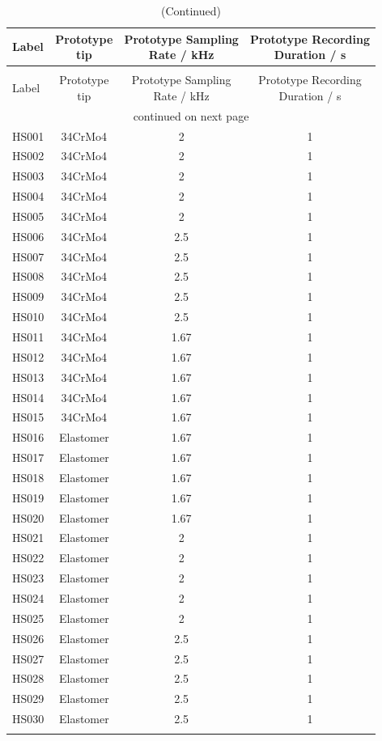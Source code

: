 {\scriptsize%
\begin{longtable}{lccc}
\caption[Hammer-Surface Measurements]{Hammer-surface measurements}\\
\toprule
Label & \makecell{Prototype\\tip} & \makecell{Prototype Sampling\\Rate / \si{\kilo\hertz}} & \makecell{Prototype Recording\\Duration / \si{\second}}\\
\midrule
\endfirsthead%
\caption[]{(Continued)}\\
\toprule
Label & \makecell{Prototype\\tip} & \makecell{Prototype Sampling\\Rate / \si{\kilo\hertz}} & \makecell{Prototype Recording\\Duration / \si{\second}}\\
\midrule
\endhead%
\midrule
\multicolumn{4}{c}{continued on next page}\\
\bottomrule
\endfoot%
\endlastfoot%
	HS001 & 34CrMo4 & 2 & 1\\
	HS002 & 34CrMo4 & 2 & 1\\
	HS003 & 34CrMo4 & 2 & 1\\
	HS004 & 34CrMo4 & 2 & 1\\
	HS005 & 34CrMo4 & 2 & 1\\
	HS006 & 34CrMo4 & 2.5 & 1\\
	HS007 & 34CrMo4 & 2.5 & 1\\
	HS008 & 34CrMo4 & 2.5 & 1\\
	HS009 & 34CrMo4 & 2.5 & 1\\
	HS010 & 34CrMo4 & 2.5 & 1\\
	HS011 & 34CrMo4 & 1.67 & 1\\
	HS012 & 34CrMo4 & 1.67 & 1\\
	HS013 & 34CrMo4 & 1.67 & 1\\
	HS014 & 34CrMo4 & 1.67 & 1\\
	HS015 & 34CrMo4 & 1.67 & 1\\
	HS016 & Elastomer & 1.67 & 1\\
	HS017 & Elastomer & 1.67 & 1\\
	HS018 & Elastomer & 1.67 & 1\\
	HS019 & Elastomer & 1.67 & 1\\
	HS020 & Elastomer & 1.67 & 1\\
	HS021 & Elastomer & 2 & 1\\
	HS022 & Elastomer & 2 & 1\\
	HS023 & Elastomer & 2 & 1\\
	HS024 & Elastomer & 2 & 1\\
	HS025 & Elastomer & 2 & 1\\
	HS026 & Elastomer & 2.5 & 1\\
	HS027 & Elastomer & 2.5 & 1\\
	HS028 & Elastomer & 2.5 & 1\\
	HS029 & Elastomer & 2.5 & 1\\
	HS030 & Elastomer & 2.5 & 1\\
\bottomrule
\label{tab:hs_tests}
\end{longtable}
}


